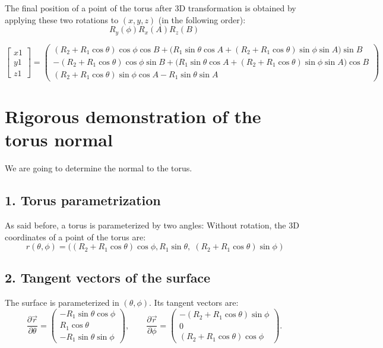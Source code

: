 \documentclass{article}
\begin{document}
\medskip

The final position of a point of the torus after 3D transformation is obtained by applying these two rotations to $(x,y,z)$ (in the following order): \[
R_y(\phi)R_x(A)R_z (B )
\]

\[
\begin{bmatrix}
x1 \\
y1 \\
z1
\end{bmatrix}
=
\begin{pmatrix}
(R_2 + R_1 \cos\theta)\cos\phi \cos B + \big(R_1 \sin\theta \cos A + (R_2 + R_1 \cos\theta)\sin\phi \sin A\big)\sin B \\[1mm]
-(R_2 + R_1 \cos\theta)\cos\phi \sin B + \big(R_1 \sin\theta \cos A + (R_2 + R_1 \cos\theta)\sin\phi \sin A\big)\cos B \\[1mm]
(R_2 + R_1 \cos\theta)\sin\phi \cos A - R_1 \sin\theta \sin A
\end{pmatrix}
\]


\section*{Rigorous demonstration of the torus normal}

We are going to determine the normal to the torus.

\subsection*{1. Torus parametrization}

As said before, a torus is parameterized by two angles: 
Without rotation, the 3D coordinates of a point of the torus are:
\[
r(\theta, \phi) = 
\big( (R_2 + R_1 \cos\theta)\cos\phi,R_1 \sin\theta,\; (R_2 + R_1 \cos\theta)\sin\phi\;  \big)
\]

\subsection*{2. Tangent vectors of the surface}

The surface is parameterized in \((\theta, \phi)\).  
Its tangent vectors are:
\[
\frac{\partial \vec{r}}{\partial \theta} =
\begin{pmatrix}
- R_1 \sin\theta \cos\phi \\
R_1 \cos\theta\\
- R_1 \sin\theta \sin\phi 

\end{pmatrix},
\qquad
 \frac{\partial \vec{r}}{\partial \phi} =
\begin{pmatrix}
- (R_2 + R_1 \cos\theta) \sin\phi \\
0\\
(R_2 + R_1 \cos\theta) \cos\phi 
\end{pmatrix}.
\]
\end{document}
